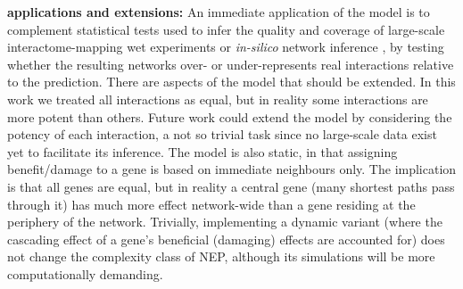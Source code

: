 \textbf{applications and extensions:} An immediate application of the model is to complement statistical tests used to infer the quality and coverage of large-scale interactome-mapping wet experiments \cite{rolland_proteome-scale_2014} or \textit{in-silico} network inference \cite{mitra_integrative_2013}, by testing whether the resulting networks over- or under-represents real interactions relative to the prediction. There are aspects of the model that should be extended. In this work we treated all interactions as equal, but in reality some interactions are more potent than others. Future work could extend the model by considering the potency of each interaction, a not so trivial task since no large-scale data exist yet to facilitate its inference. The model is also static, in  that assigning benefit/damage to a gene is based on immediate neighbours only. The implication is that all genes are equal, but in reality a central gene (many shortest paths pass through it) has much more effect network-wide than a gene residing at the periphery of the network. Trivially, implementing a dynamic variant (where the cascading effect of a gene's beneficial (damaging) effects are accounted for) does not change the complexity class of NEP, although its simulations will be more computationally demanding.


  \begin{comment}
  \section{limitations:}

  level of abstraction

  doesn't detect small perturbations (as no. of neutral genes increases, the topology becomes irrelevant)

  gene invention (assume it's part of mutation)

  networks may be undirected / unsigned .. randomize. However, doesn't affect central point

  not all data are of equal quality

  benefit/damages only one edge away

  \end{comment}
